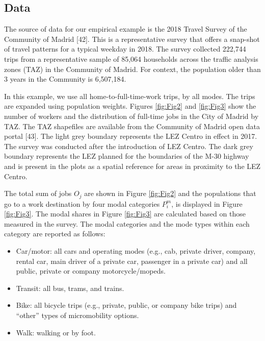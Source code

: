 \documentclass[10pt,letterpaper]{article}
\providecommand{\tightlist}{%
  \setlength{\itemsep}{0pt}\setlength{\parskip}{0pt}}
\begin{document}
\hypertarget{data}{%
\subsection{Data}\label{data}}

The source of data for our empirical example is the 2018 Travel Survey
of the Community of Madrid {[}42{]}. This is a representative survey
that offers a snap-shot of travel patterns for a typical weekday in
2018. The survey collected 222,744 trips from a representative sample of
85,064 households across the traffic analysis zones (TAZ) in the
Community of Madrid. For context, the population older than 3 years in
the Community is 6,507,184.

In this example, we use all home-to-full-time-work trips, by all modes.
The trips are expanded using population weights. Figures \ref{fig:Fig2}
and \ref{fig:Fig3} show the number of workers and the distribution of
full-time jobs in the City of Madrid by TAZ. The TAZ shapefiles are
available from the Community of Madrid open data portal {[}43{]}. The
light grey boundary represents the LEZ Centro in effect in 2017. The
survey was conducted after the introduction of LEZ Centro. The dark grey
boundary represents the LEZ planned for the boundaries of the M-30
highway and is present in the plots as a spatial reference for areas in
proximity to the LEZ Centro.

The total sum of jobs \(O_j\) are shown in Figure \ref{fig:Fig2} and the
populations that go to a work destination by four modal categories
\(P^m_i\), is displayed in Figure \ref{fig:Fig3}. The modal shares in
Figure \ref{fig:Fig3} are calculated based on those measured in the
survey. The modal categories and the mode types within each category are
reported as follows:

\begin{itemize}
\tightlist
\item
  Car/motor: all cars and operating modes (e.g., cab, private driver,
  company, rental car, main driver of a private car, passenger in a
  private car) and all public, private or company motorcycle/mopeds.
\item
  Transit: all bus, trams, and trains.
\item
  Bike: all bicycle trips (e.g., private, public, or company bike trips)
  and ``other'' types of micromobility options.
\item
  Walk: walking or by foot.
\end{itemize}
\end{document}
